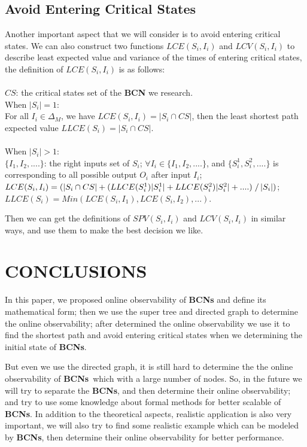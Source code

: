 \documentclass[letterpaper, 10 pt, conference]{ieeeconf}  %
\def \BCNs {{\bf BCNs}}
\begin{document}
\subsection{Avoid Entering Critical States}
Another important aspect that we will consider is to avoid entering critical states. We can also construct two functions $LCE(S_i, I_i)$ and $LCV(S_i, I_i)$ to describe least expected value and variance of the times of entering critical states, the definition of $LCE(S_i, I_i)$ is as follows:\\
\\$CS$: the critical states set of the {\bf BCN} we research.\\
When $|S_i|=1$:\\ 
For all $I_i \in \Delta_M$, we have $LCE(S_i, I_i)=|S_i \cap CS |$, then the least shortest path  expected value $LLCE(S_i)=|S_i \cap CS |$. \\
\\
When $|S_i|>1$:\\ 
$\{I_1,I_2,....\}$: the right inputs set of $S_i$; $\forall I_i \in \{I_1,I_2,....\}$, and $\{S_i^1,S_i^2,....\}$ is corresponding to all possible output $O_i$ after input $I_i$; $LCE(S_i, I_i)=(|S_i \cap CS | + (LLCE(S_i^1)|S_i^1|+LLCE(S_i^2)|S_i^2|+....)\left. \right/ |S_i|)$; $LLCE(S_i)= Min(LCE(S_i, I_1),LCE(S_i, I_2),...)$.

Then we can get the definitions of $SPV(S_i, I_i)$ and $LCV(S_i, I_i)$ in similar ways, and use them to make the best decision we like.
\section{CONCLUSIONS}

In this paper, we proposed online observability of {\bf BCNs} and define its mathematical form;  then we use the super tree and directed graph to determine the online observability; after determined the online observability we use it to find the shortest path and avoid entering critical states when we determining the initial state of {\bf BCNs}. 

But even we use the directed graph, it is still hard to determine the  the online observability of \BCNs\ which with a large number of nodes. So, in the future we will try to separate the {\bf BCNs}, and then determine their online observability; and try to use some knowledge about formal methods for better scalable of {\bf BCNs}. In addition to the theoretical aspects, realistic application is also very important, we will also try to find some realistic example which can be modeled by {\bf BCNs}, then determine their online observability for better performance.
\addtolength{\textheight}{-12cm}   %
\end{document}
